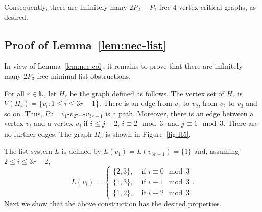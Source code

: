\documentclass[11pt]{article}
\begin{document}
Consequently, there are infinitely many $2P_2+P_1$-free 4-vertex-critical graphs, as desired.

\subsection{Proof of Lemma~\ref{lem:nec-list}}\label{sec:list-necessity}

In view of Lemma~\ref{lem:nec-col}, it remains to prove that there are infinitely many $2P_3$-free minimal list-obstructions.

For all $r \in \mathbb N$, let $H_r$ be the graph defined as follows.
The vertex set of $H_r$ is $V(H_r)=\{v_i:1\le i \le 3r-1\}$.
There is an edge from $v_1$ to $v_2$, from $v_2$ to $v_3$ and so on.
Thus, $P:=v_1$-$v_2$-\ldots-$v_{3r-1}$ is a path.
Moreover, there is an edge between a vertex $v_i$ and a vertex $v_j$ if $i \le j-2$, $i \equiv 2\mod 3$, and $j \equiv 1\mod 3$.
There are no further edges.
The graph $H_5$ is shown in Figure~\ref{fig:H5}.

The list system $L$ is defined by $L(v_1)=L(v_{3r-1})=\{1\}$ and, assuming $2 \le i \le 3r-2$,
\begin{equation*}
L(v_i)=
\begin{cases}
\{2,3\}, & \mbox{ if } i \equiv 0 \mod 3\\
\{1,3\}, & \mbox{ if } i \equiv 1 \mod 3\\
\{1,2\}, & \mbox{ if } i \equiv 2 \mod 3
\end{cases}.
\end{equation*}
Next we show that the above construction has the desired properties.
\end{document}
